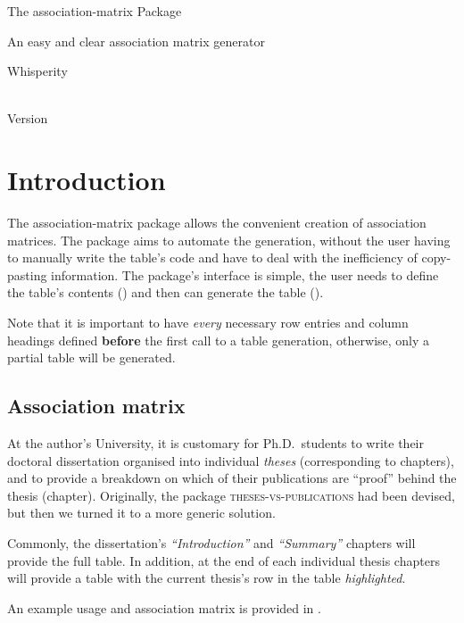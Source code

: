 \documentclass{article}
\begin{document}
\vspace*{0in}
\begin{center}
    \LARGE The \textsf{association-matrix} Package \\
    \small \rule{0in}{1em} An easy and clear association matrix generator \\
    \large \rule{0in}{2em} Whisperity \\
    \rule{0em}{2em}\amxDate \\
    Version \amxVersion
\end{center}

\tableofcontents


\section{Introduction}\label{intro}
The \textsf{association-matrix} package allows the convenient creation of association matrices.
The package aims to automate the generation, without the user having to manually write the table's code and have to deal with the inefficiency of copy-pasting information.
The package's interface is simple, the user needs to define the table's contents () and then can generate the table ().

Note that it is important to have \emph{every} necessary row entries and column headings defined \textbf{before} the first call to a table generation, otherwise, only a partial table will be generated.

\subsection{Association matrix}\label{association-mx}
At the author's University, it is customary for Ph.D.\ students to write their doctoral dissertation organised into individual \emph{theses} (corresponding to chapters), and to provide a breakdown on which of their publications are ``proof'' behind the thesis (chapter).
Originally, the package \textsc{theses-vs-publications} had been devised, but then we turned it to a more generic solution.

Commonly, the dissertation's \emph{``Introduction''} and \emph{``Summary''} chapters will provide the full table.
In addition, at the end of each individual thesis chapters will provide a table with the current thesis's row in the table \emph{highlighted}.

An example usage and association matrix is provided in .
\end{document}

